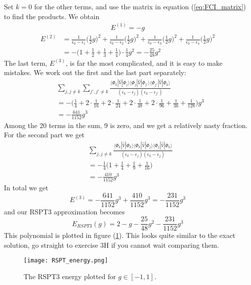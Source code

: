 \documentclass[norsk,a4paper,12pt]{article}
\begin{document}
Set $k=0$ for the other terms, and use the matrix in equation (\ref{eq:FCI_matrix}) to find the products. We obtain
\begin{align*}
E^{(1)}=-g
\end{align*}
\begin{align*}
E^{(2)}&=\frac{1}{\epsilon_0-\epsilon_1}\Big(\frac{1}{2}g\Big)^2+\frac{1}{\epsilon_0-\epsilon_2}\Big(\frac{1}{2}g\Big)^2+\frac{1}{\epsilon_0-\epsilon_3}\Big(\frac{1}{2}g\Big)^2+\frac{1}{\epsilon_0-\epsilon_4}\Big(\frac{1}{2}g\Big)^2\\
&=-\Big(1+\frac{1}{2}+\frac{1}{3}+\frac{1}{4}\Big)\cdot\frac{1}{4}g^2=-\frac{25}{48}g^2
\end{align*}
The last term, $E^{(3)}$, is far the most complicated, and it is easy to make mistakes. We work out the first and the last part separately:
\begin{align*}
&\sum_{j,j\neq k}\sum_{j',j'\neq k}\frac{\langle\Phi_k|\hat{V}|\Phi_j\rangle\langle\Phi_j|\hat{V}|\Phi_{j'}\rangle\langle\Phi_{j'}|\hat{V}|\Phi_k\rangle}{(\epsilon_k-\epsilon_j)(\epsilon_k-\epsilon_{j'})}\\
&=-\Big(\frac{1}{4}+2\cdot\frac{1}{16}+2\cdot\frac{1}{24}+2\cdot\frac{1}{48}+2\cdot\frac{1}{96}+\frac{1}{36}+\frac{1}{128}\Big)g^3\\
&=-\frac{641}{1152}g^3
\end{align*}
Among the 20 terms in the sum, 9 is zero, and we get a relatively nasty fraction. For the second part we get
\begin{align*}
&\sum_{j,j\neq k}\frac{\langle\Phi_k|\hat{V}|\Phi_k\rangle\langle\Phi_k|\hat{V}|\Phi_{j}\rangle\langle\Phi_j|\hat{V}|\Phi_k\rangle}{(\epsilon_k-\epsilon_j)(\epsilon_k-\epsilon_j)}\\
&=-\frac{1}{4}\Big(1+\frac{1}{4}+\frac{1}{9}+\frac{1}{16}\Big)\\
&=-\frac{410}{1152}g^3
\end{align*}
In total we get 
\begin{equation*}
E^{(3)}=-\frac{641}{1152}g^3+\frac{410}{1152}g^3=-\frac{231}{1152}g^3
\end{equation*}
and our RSPT3 approximation becomes
\begin{equation}
E_{RSPT3}(g)=2-g-\frac{25}{48}g^2 - \frac{231}{1152}g^3
\end{equation}
This polynomial is plotted in figure (\ref{fig:RSPT_energy}). This looks quite similar to the exact solution, go straight to exercise 3H if you cannot wait comparing them.
\begin{figure}[H]
\centering
\texttt{[image: RSPT\_energy.png]}
\caption{The RSPT3 energy plotted for $g\in[-1, 1]$. \label{fig:RSPT_energy}}
\end{figure}
\end{document}
